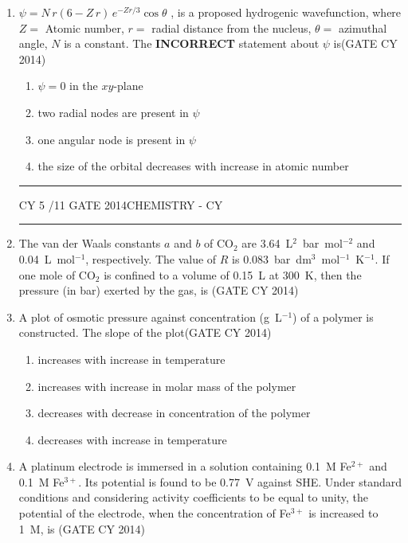 \documentclass[a4paper,10pt]{exam}
\theoremstyle{remark}
\begin{document}
\begin{enumerate}
\item $\psi = N\, r (6 - Z\, r)\, e^{-Z r/3} \cos \theta$ , is a proposed hydrogenic wavefunction, where $Z=$ Atomic number, $r=$ radial distance from the nucleus, $\theta =$ azimuthal angle, $N$ is a constant. The \textbf{INCORRECT} statement about $\psi$ is\hfill{(GATE CY 2014)}
\begin{enumerate}
    \item $\psi = 0$ in the $xy$-plane
    \item two radial nodes are present in $\psi$
    \item one angular node is present in $\psi$
    \item the size of the orbital decreases with increase in atomic number
\end{enumerate}
\vfill
\noindent\rule{\linewidth}{0.4pt}
CY \hfill 5 /11
\newpage
GATE 2014\hfill CHEMISTRY - CY\\
\noindent\rule{\linewidth}{0.4pt}
\item The van der Waals constants $a$ and $b$ of CO$_2$ are 3.64~L$^2$~bar~mol$^{-2}$ and 0.04~L~mol$^{-1}$, respectively. The value of $R$ is 0.083~bar~dm$^3$~mol$^{-1}$~K$^{-1}$. If one mole of CO$_2$ is confined to a volume of 0.15~L at 300~K, then the pressure (in bar) exerted by the gas, is \underline{\hspace{2cm}}\hfill{(GATE CY 2014)}

\item A plot of osmotic pressure against concentration (g~L$^{-1}$) of a polymer is constructed. The slope of the plot\hfill{(GATE CY 2014)}
\begin{enumerate}
    \item increases with increase in temperature
    \item increases with increase in molar mass of the polymer
    \item decreases with decrease in concentration of the polymer
    \item decreases with increase in temperature
\end{enumerate}

\item A platinum electrode is immersed in a solution containing 0.1~M Fe$^{2+}$ and 0.1~M Fe$^{3+}$. Its potential is found to be 0.77~V against SHE. Under standard conditions and considering activity coefficients to be equal to unity, the potential of the electrode, when the concentration of Fe$^{3+}$ is increased to 1~M, is \underline{\hspace{2cm}}\hfill{(GATE CY 2014)}


\end{enumerate}
\end{document}

